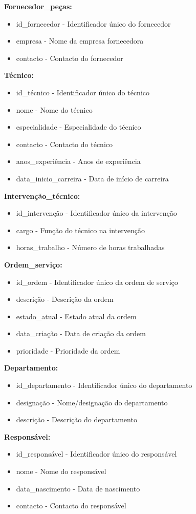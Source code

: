 \textbf{Fornecedor\_peças:}
\begin{itemize}
    \item id\_fornecedor - Identificador único do fornecedor
    \item empresa - Nome da empresa fornecedora
    \item contacto - Contacto do fornecedor
\end{itemize}

\textbf{Técnico:}
\begin{itemize}
    \item id\_técnico - Identificador único do técnico
    \item nome - Nome do técnico
    \item especialidade - Especialidade do técnico
    \item contacto - Contacto do técnico
    \item anos\_experiência - Anos de experiência
    \item data\_inicio\_carreira - Data de início de carreira
\end{itemize}

\textbf{Intervenção\_técnico:}
\begin{itemize}
    \item id\_intervenção - Identificador único da intervenção
    \item cargo - Função do técnico na intervenção
    \item horas\_trabalho - Número de horas trabalhadas
\end{itemize}

\textbf{Ordem\_serviço:}
\begin{itemize}
    \item id\_ordem - Identificador único da ordem de serviço
    \item descrição - Descrição da ordem
    \item estado\_atual - Estado atual da ordem
    \item data\_criação - Data de criação da ordem
    \item prioridade - Prioridade da ordem
\end{itemize}

\textbf{Departamento:}
\begin{itemize}
    \item id\_departamento - Identificador único do departamento
    \item designação - Nome/designação do departamento
    \item descrição - Descrição do departamento
\end{itemize}

\textbf{Responsável:}
\begin{itemize}
    \item id\_responsável - Identificador único do responsável
    \item nome - Nome do responsável
    \item data\_nascimento - Data de nascimento
    \item contacto - Contacto do responsável
\end{itemize}